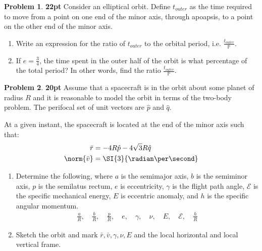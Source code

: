 \documentclass[10pt]{article}
\theoremstyle{definition}
\newtheorem{prob}{Problem}[section]
\newenvironment{subprob}%
{\renewcommand{\theenumi}{\alph{enumi}}\renewcommand{\labelenumi}{(\theenumi)}\begin{enumerate}}%
{\end{enumerate}}%
\begin{document}
\clearpage\newpage
\null\newpage
\null\newpage
\begin{prob}
    \textbf{22pt}
Consider an elliptical  orbit.
Define \( t_{outer} \) as the time required to move from a point on one end of the minor axis, through apoapsis, to a point on the other end of the minor axis.

\begin{subprob}
    \item Write an expression for the ratio of \( t_{outer} \) to the orbital period, i.e. \(\frac{t_{outer}}{\mathbb{P}}\).
    \item If \( e = \frac{3}{4} \), the time spent in the outer half of the orbit is what percentage of the total period? In other words, find the ratio \( \frac{t_{outer}}{\mathbb{P}} \).
\end{subprob}
\end{prob}

\clearpage\newpage
\null\newpage
\null\newpage
\begin{prob}
    \textbf{20pt}
    Assume that a spacecraft is in the orbit about some planet of radius \( R\) and it is reasonable to model the orbit in terms of the two-body problem.
    The perifocal set of unit vectors are \( \hat p \) and \( \hat q \).

    At a given instant, the spacecraft is located at the end of the minor axis such that:
    \begin{align*}
        \bar r &= -4 R \hat p - 4 \sqrt{3} R \hat q \\
        \norm{\bar v} &= \SI{3}{\radian\per\second}
    \end{align*}

\begin{subprob}
\item Determine the following, where \( a \) is the semimajor axis, \( b \) is the semiminor axis, \( p \) is the semilatus rectum, \( e \) is eccentricity, \( \gamma \) is the flight path angle, \( \mathcal{E} \) is the specific mechanical energy, \( E \) is eccentric anomaly, and \( h \) is the specific angular momentum.
        \begin{align*}
            \frac{a}{R}, \quad \frac{b}{R}, \quad \frac{p}{R}, \quad e, \quad \gamma, \quad \nu, \quad E, \quad \mathcal{E}, \quad \frac{h}{R}
        \end{align*}
    \item Sketch the orbit and mark \( \bar r, \bar v , \gamma, \nu, E\) and the local horizontal and local vertical frame.
\end{subprob}
\end{prob}
\clearpage\newpage
\null\newpage
\null\newpage
\end{document}
